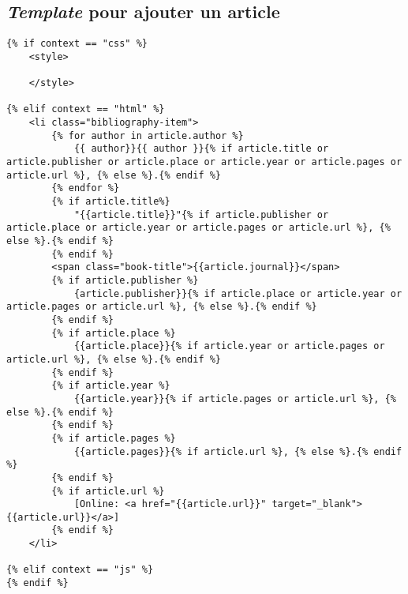 \documentclass{article}
\begin{document}
\subsection{\textit{Template} pour ajouter un article}
\begin{verbatim}
{% if context == "css" %}
    <style>

    </style>

{% elif context == "html" %}
    <li class="bibliography-item">
        {% for author in article.author %}
            {{ author}}{{ author }}{% if article.title or article.publisher or article.place or article.year or article.pages or article.url %}, {% else %}.{% endif %}
        {% endfor %}
        {% if article.title%}
            "{{article.title}}"{% if article.publisher or article.place or article.year or article.pages or article.url %}, {% else %}.{% endif %}
        {% endif %}
        <span class="book-title">{{article.journal}}</span>
        {% if article.publisher %}
            {article.publisher}}{% if article.place or article.year or article.pages or article.url %}, {% else %}.{% endif %}
        {% endif %}
        {% if article.place %}
            {{article.place}}{% if article.year or article.pages or article.url %}, {% else %}.{% endif %}
        {% endif %}
        {% if article.year %}
            {{article.year}}{% if article.pages or article.url %}, {% else %}.{% endif %}
        {% endif %}
        {% if article.pages %}
            {{article.pages}}{% if article.url %}, {% else %}.{% endif %}
        {% endif %}
        {% if article.url %}
            [Online: <a href="{{article.url}}" target="_blank">{{article.url}}</a>]
        {% endif %}
    </li>

{% elif context == "js" %}
{% endif %}

\end{verbatim}
\end{document}
